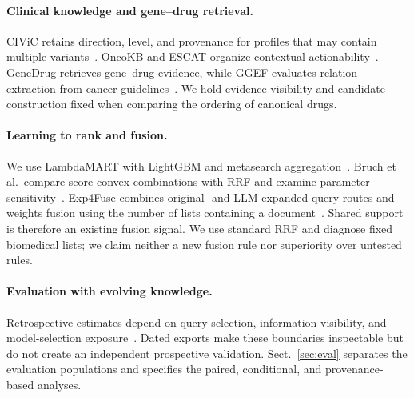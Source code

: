 \paragraph{Clinical knowledge and gene--drug retrieval.}
CIViC retains direction, level, and provenance for profiles that may contain multiple variants~\cite{civic,civic2022,civiccuration,civicmp}. OncoKB and ESCAT organize contextual actionability~\cite{oncokb,escat}. GeneDrug retrieves gene--drug evidence, while GGEF evaluates relation extraction from cancer guidelines~\cite{genedrug,ggef}. We hold evidence visibility and candidate construction fixed when comparing the ordering of canonical drugs.

\paragraph{Learning to rank and fusion.}
We use LambdaMART with LightGBM and metasearch aggregation~\cite{lambdamart,lightgbm,metasearch,rrf}. Bruch et al.\ compare score convex combinations with RRF and examine parameter sensitivity~\cite{bruch}. Exp4Fuse combines original- and LLM-expanded-query routes and weights fusion using the number of lists containing a document~\cite{exp4fuse}. Shared support is therefore an existing fusion signal. We use standard RRF and diagnose fixed biomedical lists; we claim neither a new fusion rule nor superiority over untested rules.

\paragraph{Evaluation with evolving knowledge.}
Retrospective estimates depend on query selection, information visibility, and model-selection exposure~\cite{cawley,kapoor}. Dated exports make these boundaries inspectable but do not create an independent prospective validation. Sect.~\ref{sec:eval} separates the evaluation populations and specifies the paired, conditional, and provenance-based analyses.
